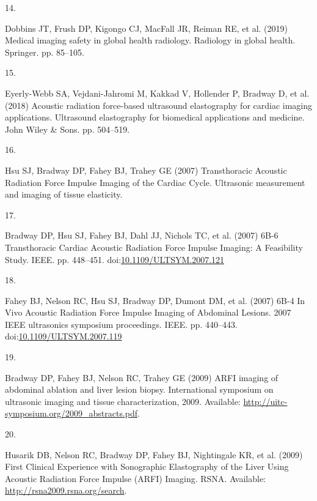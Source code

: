 \documentclass[
]{article}
\newlength{\cslhangindent}
\newlength{\csllabelwidth}
\newlength{\cslentryspacingunit} %
\newenvironment{CSLReferences}[2] %
 {%
  \setlength{\parindent}{0pt}
  \ifodd #1
  \let\oldpar\par
  \def\par{\hangindent=\cslhangindent\oldpar}
  \fi
  \setlength{\parskip}{#2\cslentryspacingunit}
 }%
 {}
\newcommand{\CSLLeftMargin}[1]{\parbox[t]{\csllabelwidth}{#1}}
\newcommand{\CSLRightInline}[1]{\parbox[t]{\linewidth - \csllabelwidth}{#1}\break}
\begin{document}
\begin{CSLReferences}{0}{0}
\leavevmode{}%
\CSLLeftMargin{14. }
\CSLRightInline{Dobbins JT, Frush DP, Kigongo CJ, MacFall JR, Reiman RE,
et al. (2019) Medical imaging safety in global health radiology.
Radiology in global health. Springer. pp. 85--105.}

\leavevmode{}%
\CSLLeftMargin{15. }
\CSLRightInline{Eyerly-Webb SA, Vejdani-Jahromi M, Kakkad V, Hollender
P, Bradway D, et al. (2018) Acoustic radiation force-based ultrasound
elastography for cardiac imaging applications. Ultrasound elastography
for biomedical applications and medicine. John Wiley \& Sons. pp.
504--519.}

\leavevmode{}%
\CSLLeftMargin{16. }
\CSLRightInline{Hsu SJ, Bradway DP, Fahey BJ, Trahey GE (2007)
{Transthoracic Acoustic Radiation Force Impulse Imaging of the Cardiac
Cycle}. Ultrasonic measurement and imaging of tissue elasticity.}

\leavevmode{}%
\CSLLeftMargin{17. }
\CSLRightInline{Bradway DP, Hsu SJ, Fahey BJ, Dahl JJ, Nichols TC, et
al. (2007) {6B-6 Transthoracic Cardiac Acoustic Radiation Force Impulse
Imaging: A Feasibility Study}. IEEE. pp. 448--451.
doi:\href{https://doi.org/10.1109/ULTSYM.2007.121}{10.1109/ULTSYM.2007.121}}

\leavevmode{}%
\CSLLeftMargin{18. }
\CSLRightInline{Fahey BJ, Nelson RC, Hsu SJ, Bradway DP, Dumont DM, et
al. (2007) {6B-4 In Vivo Acoustic Radiation Force Impulse Imaging of
Abdominal Lesions}. 2007 IEEE ultrasonics symposium proceedings. IEEE.
pp. 440--443.
doi:\href{https://doi.org/10.1109/ULTSYM.2007.119}{10.1109/ULTSYM.2007.119}}

\leavevmode{}%
\CSLLeftMargin{19. }
\CSLRightInline{Bradway DP, Fahey BJ, Nelson RC, Trahey GE (2009) {ARFI
imaging of abdominal ablation and liver lesion biopsy}. International
symposium on ultrasonic imaging and tissue characterization, 2009.
Available: \url{http://uitc-symposium.org/2009_abstracts.pdf}.}

\leavevmode{}%
\CSLLeftMargin{20. }
\CSLRightInline{Husarik DB, Nelson RC, Bradway DP, Fahey BJ, Nightingale
KR, et al. (2009) {First Clinical Experience with Sonographic
Elastography of the Liver Using Acoustic Radiation Force Impulse (ARFI)
Imaging}. RSNA. Available: \url{http://rsna2009.rsna.org/search}.}


\end{CSLReferences}
\end{document}
